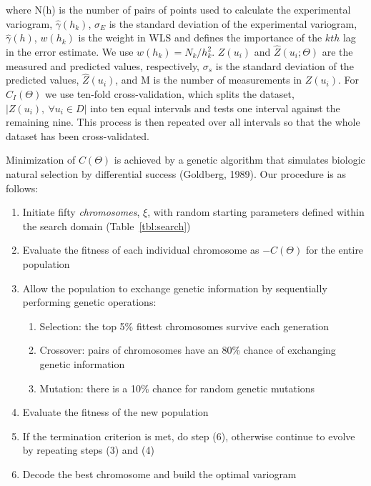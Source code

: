 \documentclass[draft,linenumbers]{agujournal2018}
\begin{document}
where N(h) is the number of pairs of points used to calculate the
experimental variogram, \(\hat{\gamma}(h_k)\), \(\sigma_E\) is the
standard deviation of the experimental variogram, \(\hat{\gamma}(h)\),
\(w(h_k)\) is the weight in WLS and defines the importance of the
\(kth\) lag in the error estimate. We use \(w(h_k) = N_k/h_k^2\).
\(Z(u_i)\) and \(\hat{Z}(u_i; \Theta)\) are the measured and predicted
values, respectively, \(\sigma_s\) is the standard deviation of the
predicted values, \(\hat{Z}(u_i)\), and M is the number of measurements
in \(Z(u_i)\). For \(C_I(\Theta)\) we use ten-fold cross-validation,
which splits the dataset, \(|Z(u_i), ~\forall u_i \in D|\) into ten
equal intervals and tests one interval against the remaining nine. This
process is then repeated over all intervals so that the whole dataset
has been cross-validated.

Minimization of \(C(\Theta)\) is achieved by a genetic algorithm that
simulates biologic natural selection by differential success (Goldberg,
1989). Our procedure is as follows:

\begin{enumerate}
\def\labelenumi{\arabic{enumi}.}
\item
  Initiate fifty \emph{chromosomes}, \(\xi\), with random starting
  parameters defined within the search domain (Table~\ref{tbl:search})
\item
  Evaluate the fitness of each individual chromosome as \(-C(\Theta)\)
  for the entire population
\item
  Allow the population to exchange genetic information by sequentially
  performing genetic operations:

  \begin{enumerate}
  \def\labelenumii{\alph{enumii}.}
  \item
    Selection: the top 5\% fittest chromosomes survive each generation
  \item
    Crossover: pairs of chromosomes have an 80\% chance of exchanging
    genetic information
  \item
    Mutation: there is a 10\% chance for random genetic mutations
  \end{enumerate}
\item
  Evaluate the fitness of the new population
\item
  If the termination criterion is met, do step (6), otherwise continue
  to evolve by repeating steps (3) and (4)
\item
  Decode the best chromosome and build the optimal variogram
\end{enumerate}
\end{document}
